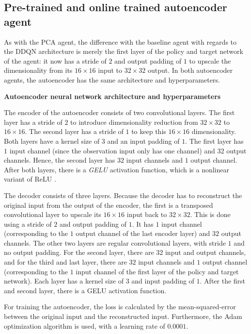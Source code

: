 \subsection{Pre-trained and online trained autoencoder agent} %
As with the PCA agent, the difference with the baseline agent with regards to the DDQN architecture is merely the first layer of the policy and target network of the agent: it now has a stride of $2$ and output padding of $1$ to upscale the dimensionality from its $16 \times 16$ input to $32 \times 32$ output. In both autoencoder agents, the autoencoder has the same architecture and hyperparameters.\newline\par

\noindent \textbf{Autoencoder neural network architecture and hyperparameters} \par
\noindent The encoder of the autoencoder consists of two convolutional layers. The first layer has a stride of $2$ to introduce dimensionality reduction from $32 \times 32$ to $16 \times 16$. The second layer has a stride of $1$ to keep this $16 \times 16$ dimensionality. Both layers have a kernel size of $3$ and an input padding of $1$. The first layer has $1$ input channel (since the observation input only has one channel) and $32$ output channels. Hence, the second layer has $32$ input channels and $1$ output channel. After both layers, there is a \emph{GELU} activation function, which is a nonlinear variant of ReLU \cite{gelu}.

The decoder consists of three layers. Because the decoder has to reconstruct the original input from the output of the encoder, the first is a transposed convolutional layer to upscale its $16 \times 16$ input back to $32 \times 32$. This is done using a stride of $2$ and output padding of $1$. It has $1$ input channel (corresponding to the $1$ output channel of the last encoder layer) and $32$ output channels. The other two layers are regular convolutional layers, with stride $1$ and no output padding. For the second layer, there are $32$ input and output channels, and for the third and last layer, there are $32$ input channels and $1$ output channel (corresponding to the $1$ input channel of the first layer of the policy and target network). Each layer has a kernel size of $3$ and input padding of $1$. After the first and second layer, there is a GELU activation function.

For training the autoencoder, the loss is calculated by the mean-squared-error between the original input and the reconstructed input. Furthermore, the Adam optimization algorithm is used, with a learning rate of $0.0001$. 


